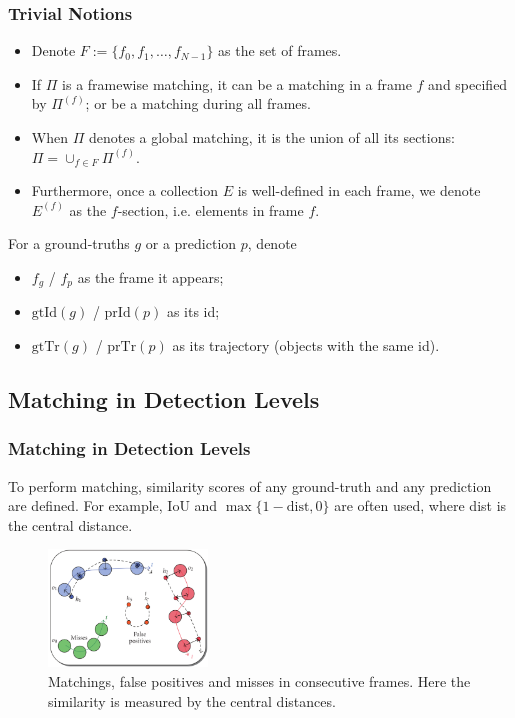 \documentclass[slidetop, mathserif]{beamer}
\begin{document}
\begin{frame}
	\frametitle{Trivial Notions}
	
	\begin{itemize}
		\item Denote $F:=\{f_0, f_1, \ldots, f_{N-1}\}$ as the set of frames.
		\item If $\Pi$ is a framewise matching, it can be a matching in a frame $f$ and specified by $\Pi^{(f)}$;
		      or be a matching during all frames.
		\item When $\Pi$ denotes a global matching, it is the union of all its sections:
		      $\Pi = \cup_{f\in F}\Pi^{(f)}$.
		\item Furthermore, once a collection $E$ is well-defined in each frame,
		      we denote $E^{(f)}$ as the $f$-section, i.e. elements in frame $f$.
		      
	\end{itemize}
	
	For a ground-truths $g$ or a prediction $p$, denote
	\begin{itemize}
		\item $f_g$ / $f_p$ as the frame it appears;
		\item $\text{gtId}(g)$ / $\text{prId}(p)$ as its id;
		\item $\text{gtTr}(g)$ / $\text{prTr}(p)$ as its trajectory (objects with the same id).
	\end{itemize}
\end{frame}

\subsection{Matching in Detection Levels}

\begin{frame}
	\frametitle{Matching in Detection Levels}
	
	To perform matching, similarity scores of any ground-truth and any prediction
	are defined. For example, IoU and $\max\{1-\text{dist}, 0\}$ are often used,
	where dist is the central distance.
	
	\begin{figure}
		\includegraphics[width=120pt]{pics/fig2.png}
		\caption{Matchings, false positives and misses in consecutive frames.
			Here the similarity is measured by the central distances.}
	\end{figure}
	
\end{frame}
\end{document}
